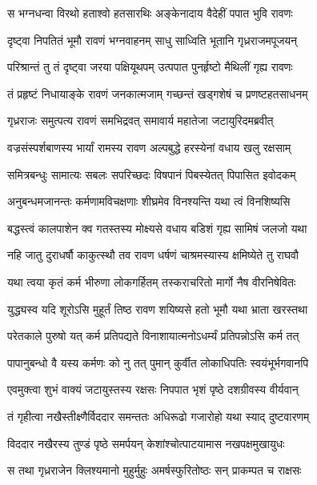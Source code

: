 \twolineshloka
{स भग्नधन्वा विरथो हताश्वो हतसारथिः}
{अङ्केनादाय वैदेहीं पपात भुवि रावणः} %

\twolineshloka
{दृष्ट्वा निपतितं भूमौ रावणं भग्नवाहनम्}
{साधु साध्विति भूतानि गृध्रराजमपूजयन्} %

\twolineshloka
{परिश्रान्तं तु तं दृष्ट्वा जरया पक्षियूथपम्}
{उत्पपात पुनर्हृष्टो मैथिलीं गृह्य रावणः} %

\twolineshloka
{तं प्रहृष्टं निधायाङ्के रावणं जनकात्मजाम्}
{गच्छन्तं खड्गशेषं च प्रणष्टहतसाधनम्} %

\twolineshloka
{गृध्रराजः समुत्पत्य रावणं समभिद्रवत्}
{समावार्य महातेजा जटायुरिदमब्रवीत्} %

\twolineshloka
{वज्रसंस्पर्शबाणस्य भार्यां रामस्य रावण}
{अल्पबुद्धे हरस्येनां वधाय खलु रक्षसाम्} %

\twolineshloka
{समित्रबन्धुः सामात्यः सबलः सपरिच्छदः}
{विषपानं पिबस्येतत् पिपासित इवोदकम्} %

\twolineshloka
{अनुबन्धमजानन्तः कर्मणामविचक्षणाः}
{शीघ्रमेव विनश्यन्ति यथा त्वं विनशिष्यसि} %

\twolineshloka
{बद्धस्त्वं कालपाशेन क्व गतस्तस्य मोक्ष्यसे}
{वधाय बडिशं गृह्य सामिषं जलजो यथा} %

\twolineshloka
{नहि जातु दुराधर्षौ काकुत्स्थौ तव रावण}
{धर्षणं चाश्रमस्यास्य क्षमिष्येते तु राघवौ} %

\twolineshloka
{यथा त्वया कृतं कर्म भीरुणा लोकगर्हितम्}
{तस्कराचरितो मार्गो नैष वीरनिषेवितः} %

\twolineshloka
{युद्ध्यस्व यदि शूरोऽसि मुहूर्तं तिष्ठ रावण}
{शयिष्यसे हतो भूमौ यथा भ्राता खरस्तथा} %

\twolineshloka
{परेतकाले पुरुषो यत् कर्म प्रतिपद्यते}
{विनाशायात्मनोऽधर्म्यं प्रतिपन्नोऽसि कर्म तत्} %

\twolineshloka
{पापानुबन्धो वै यस्य कर्मणः को नु तत् पुमान्}
{कुर्वीत लोकाधिपतिः स्वयंभूर्भगवानपि} %

\twolineshloka
{एवमुक्त्वा शुभं वाक्यं जटायुस्तस्य रक्षसः}
{निपपात भृशं पृष्ठे दशग्रीवस्य वीर्यवान्} %

\twolineshloka
{तं गृहीत्वा नखैस्तीक्ष्णैर्विददार समन्ततः}
{अधिरूढो गजारोहो यथा स्याद् दुष्टवारणम्} %

\twolineshloka
{विददार नखैरस्य तुण्डं पृष्ठे समर्पयन्}
{केशांश्चोत्पाटयामास नखपक्षमुखायुधः} %

\twolineshloka
{स तथा गृध्रराजेन क्लिश्यमानो मुहुर्मुहुः}
{अमर्षस्फुरितोष्ठः सन् प्राकम्पत च राक्षसः} %

